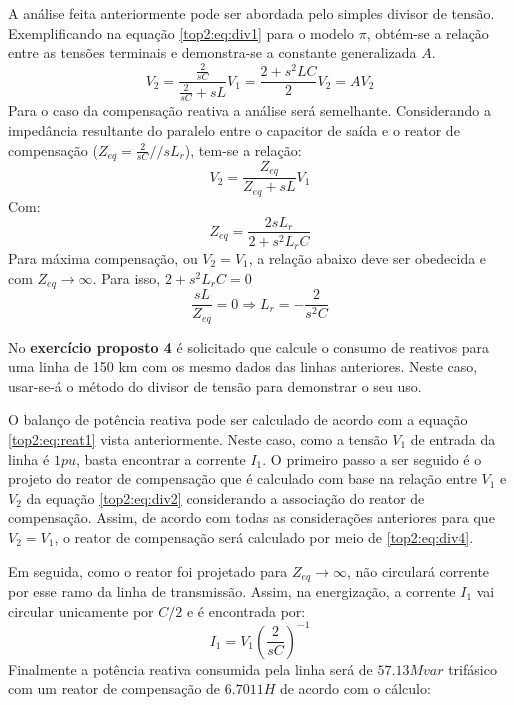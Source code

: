 A análise feita anteriormente pode ser abordada pelo simples divisor de tensão. Exemplificando na equação \ref{top2:eq:div1} para o modelo $\pi$, obtém-se a relação entre as tensões terminais e demonstra-se a constante generalizada $A$.
\begin{equation} \label{top2:eq:div1}
V_2 = \frac{\frac{2}{sC}}{\frac{2}{sC}+sL}V_1 = \frac{2+s^2LC}{2}V_2 = A V_2
\end{equation}
Para o caso da compensação reativa a análise será semelhante. Considerando a impedância resultante do paralelo entre o capacitor de saída e o reator de compensação ($Z_{eq} = \frac{2}{sC}//sL_r$), tem-se a relação:
\begin{equation} \label{top2:eq:div2}
V_2 = \frac{Z_{eq}}{Z_{eq}+sL}V_1 
\end{equation}
Com:
\begin{equation} \label{top2:eq:div3}
Z_{eq} = \frac{2sL_r}{2+s^2L_rC}
\end{equation}
Para máxima compensação, ou $V_2=V_1$, a relação abaixo deve ser obedecida e com $Z_{eq}\rightarrow \infty$. Para isso, $2+s^2L_rC = 0$
\begin{equation} \label{top2:eq:div4}
\frac{sL}{Z_{eq}} = 0 \Rightarrow L_r = -\frac{2}{s^2C}
\end{equation}

No \textbf{exercício proposto 4} é solicitado que calcule o consumo de reativos para uma linha de 150 km com os mesmo dados das linhas anteriores. Neste caso, usar-se-á o método do divisor de tensão para demonstrar o seu uso.

O balanço de potência reativa pode ser calculado de acordo com a equação \ref{top2:eq:reat1} vista anteriormente. Neste caso, como a tensão $V_1$ de entrada da linha é $1pu$, basta encontrar a corrente $I_1$. O primeiro passo a ser seguido é o projeto do reator de compensação que é calculado com base na relação entre $V_1$ e $V_2$ da equação \ref{top2:eq:div2} considerando a associação do reator de compensação. Assim, de acordo com todas as considerações anteriores para que $V_2=V_1$, o reator de compensação será calculado por meio de \ref{top2:eq:div4}. 

Em seguida, como o reator foi projetado para $Z_{eq} \rightarrow \infty$, não circulará corrente por esse ramo da linha de transmissão. Assim, na energização, a corrente $I_1$ vai circular unicamente por $C/2$ e é encontrada por:
\begin{equation} \label{top2:eq:div5}
I_1 = V_1\left(\frac{2}{sC}\right)^{-1}
\end{equation}
Finalmente a potência reativa consumida pela linha será de $57.13Mvar$ trifásico com um reator de compensação de $6.7011 H$ de acordo com o cálculo:


